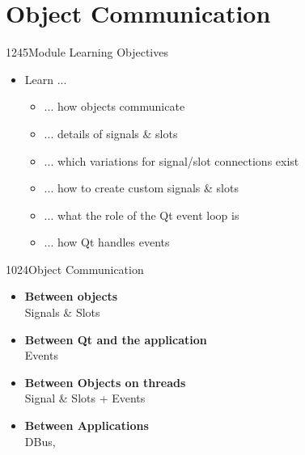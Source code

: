 %
%
%
%

\section{Object Communication}

\begin{slide}{1245}{Module Learning Objectives}
\begin{itemize}
\item Learn ...
  \begin{itemize}
  \item ... how objects communicate
  \item ... details of signals \& slots
  \item ... which variations for signal/slot connections exist
  \item ... how to create custom signals \& slots
  \item ... what the role of the Qt event loop is
  \item ... how Qt handles events
  \end{itemize}
\end{itemize}

\end{slide}


\begin{slide}{1024}{Object Communication}
\begin{itemize}
  \item \textbf{Between objects}\\
    Signals \& Slots\medskip
  \item \textbf{Between Qt and the application}\\
    Events\medskip
  \item \textbf{Between Objects on threads}\\
    Signal \& Slots + Events\medskip
  \item \textbf{Between Applications}\\
    DBus, 
\end{itemize}

\end{slide}






